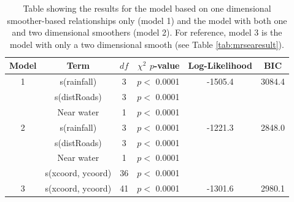 \documentclass[letterpaper]{interact}
\begin{document}
\begin{table}[!ht]
\centering
\caption{Table showing the results for the model based on one dimensional smoother-based relationships only (model 1) and the model with both one and two dimensional smoothers (model 2). For reference, model 3 is the model with only a two dimensional smooth (see Table \ref{tab:mrsearesult}).}
\vspace{0.5cm}
\begin{tabular}{c|c|c|r|c|c}
Model & Term  & $df$ & $\chi^2$ $p$-value  & Log-Likelihood & BIC\\\hline
1 & s(rainfall) & 3 & $p <$ 0.0001  &  -1505.4 & 3084.4\\
 & s(distRoads) & 3 & $p <$ 0.0001  &  & \\
 & Near water & 1 & $p <$ 0.0001  &  & \\\hline
2 & s(rainfall) & 3 &  $p <$ 0.0001  & -1221.3 & 2848.0\\
 & s(distRoads) & 3 & $p <$ 0.0001  & &\\
  & Near water & 1 & $p <$ 0.0001  & &\\
 & s(xcoord, ycoord) &  36 &  $p <$ 0.0001  & &\\\hline
3 & s(xcoord, ycoord) & 41 & $p <$ 0.0001 & -1301.6 & 2980.1\\\hline
\end{tabular}
\label{tab:1Dresult}
\end{table}

\newpage

\end{document}
